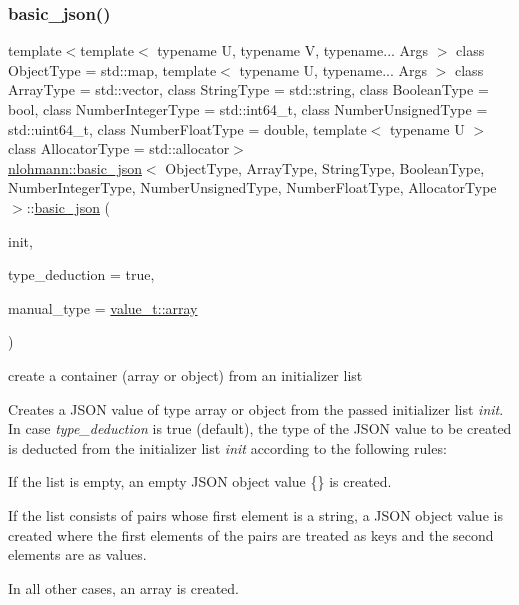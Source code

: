 \subsubsection{\texorpdfstring{basic\+\_\+json()}{basic\_json()}\hspace{0.1cm}{\footnotesize\ttfamily [18/23]}}
{\footnotesize\ttfamily template$<$template$<$ typename U, typename V, typename... Args $>$ class Object\+Type = std\+::map, template$<$ typename U, typename... Args $>$ class Array\+Type = std\+::vector, class String\+Type  = std\+::string, class Boolean\+Type  = bool, class Number\+Integer\+Type  = std\+::int64\+\_\+t, class Number\+Unsigned\+Type  = std\+::uint64\+\_\+t, class Number\+Float\+Type  = double, template$<$ typename U $>$ class Allocator\+Type = std\+::allocator$>$ \\
\hyperlink{classnlohmann_1_1basic__json}{nlohmann\+::basic\+\_\+json}$<$ Object\+Type, Array\+Type, String\+Type, Boolean\+Type, Number\+Integer\+Type, Number\+Unsigned\+Type, Number\+Float\+Type, Allocator\+Type $>$\+::\hyperlink{classnlohmann_1_1basic__json}{basic\+\_\+json} (\begin{DoxyParamCaption}\item[{std\+::initializer\+\_\+list$<$ \hyperlink{classnlohmann_1_1basic__json}{basic\+\_\+json}$<$ Object\+Type, Array\+Type, String\+Type, Boolean\+Type, Number\+Integer\+Type, Number\+Unsigned\+Type, Number\+Float\+Type, Allocator\+Type $>$ $>$}]{init,  }\item[{bool}]{type\+\_\+deduction = {\ttfamily true},  }\item[{\hyperlink{classnlohmann_1_1basic__json_a231b02148577b69a154b2ce2c87a5522}{value\+\_\+t}}]{manual\+\_\+type = {\ttfamily \hyperlink{classnlohmann_1_1basic__json_a231b02148577b69a154b2ce2c87a5522af1f713c9e000f5d3f280adbd124df4f5}{value\+\_\+t\+::array}} }\end{DoxyParamCaption})\hspace{0.3cm}{\ttfamily [inline]}}



create a container (array or object) from an initializer list 

Creates a J\+S\+ON value of type array or object from the passed initializer list {\itshape init}. In case {\itshape type\+\_\+deduction} is {\ttfamily true} (default), the type of the J\+S\+ON value to be created is deducted from the initializer list {\itshape init} according to the following rules\+:


\begin{DoxyEnumerate}
\item If the list is empty, an empty J\+S\+ON object value {\ttfamily \{\}} is created.
\item If the list consists of pairs whose first element is a string, a J\+S\+ON object value is created where the first elements of the pairs are treated as keys and the second elements are as values.
\item In all other cases, an array is created.
\end{DoxyEnumerate}

